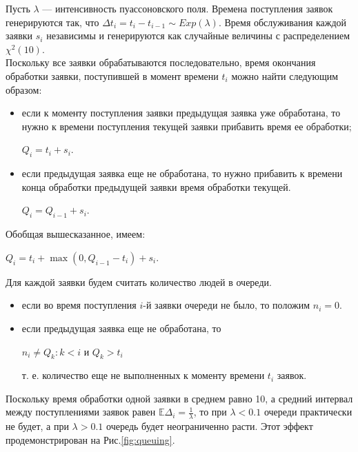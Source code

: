 Пусть $\lambda$ --- интенсивность пуассоновского поля. Времена 
 поступления заявок генерируются так, что $\Delta t_i = t_i - t_{i - 1} 
 \sim Exp(\lambda)$.
 Время обслуживания каждой заявки $s_i$ независимы и генерируются как 
 случайные величины с распределением $\chi^2(10)$.\\
Поскольку все заявки обрабатываются последовательно, время окончания 
 обработки заявки, поступившей в момент времени $t_i$ можно найти 
 следующим образом:
\begin{itemize}
	\item если к моменту поступления заявки предыдущая заявка уже 
     обработана, то нужно к времени поступления текущей заявки прибавить 
     время ее обработки;
	\begin{center}
		$Q_i = t_i + s_i.$
	\end{center}
	\item если предыдущая заявка еще не обработана, то нужно прибавить к 
     времени конца обработки предыдущей заявки время обработки текущей.
\begin{center}
		$Q_i = Q_{i-1} + s_i.$
\end{center}

\end{itemize}
Обобщая вышесказанное, имеем:
\begin{center}
		$Q_i = t_i + \max(0, Q_{i - 1} - t_i) + s_i.$
\end{center}

Для каждой заявки будем считать количество людей в очереди.

\begin{itemize}
	\item если во время поступления $i$-й заявки очереди не было, то 
     положим $n_i = 0$.

	\item если предыдущая заявка еще не обработана, то 
	
	\begin{center}
		$n_i \neq Q_k : k < i$ и $Q_k > t_i$
	\end{center}
т. е. количество еще не выполненных к моменту времени $t_i$ заявок.
\end{itemize}

Поскольку время обработки одной заявки в среднем равно 10, а средний 
 интервал между поступлениями заявок равен $\mathbb{E}\Delta_i = 
 \frac{1}{\lambda}$, то при $\lambda < 0.1$ очереди практически не 
 будет, а при $\lambda > 0.1$ очередь будет неограниченно расти. Этот
 эффект продемонстрирован на Рис.\eqref{fig:queuing}.

